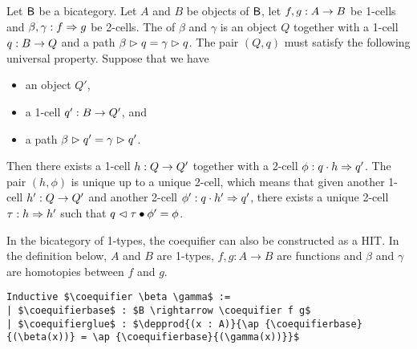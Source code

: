 \begin{definition}
Let $\mathsf{B}$ be a bicategory. Let $A$ and $B$ be objects of $\mathsf{B}$, let $f,
g : A \rightarrow B$ be 1-cells and $\beta,\gamma : f \Rightarrow
g$ be 2-cells. The  of $\beta$ and $\gamma$ is an object $Q$
together with a 1-cell $q : B \rightarrow Q$ and a path
$\beta \vartriangleright q = \gamma \vartriangleright q$.
The pair $(Q,q)$ must satisfy the following universal
property. Suppose that we have
\begin{itemize}
\item an object $Q'$,
\item a 1-cell $q' : B \rightarrow Q'$, and
\item a path $\beta \vartriangleright q' = \gamma \vartriangleright q'$.
\end{itemize}
Then there exists a 1-cell $h : Q \rightarrow Q'$ together with a 2-cell
$\phi : q \cdot h \Rightarrow q'$. The pair $(h,\phi)$ is unique up to a unique 2-cell, which means that
given another 1-cell $h' : Q \rightarrow Q'$ and another 2-cell $\phi' :
q \cdot h' \Rightarrow q'$, there exists a unique 2-cell $\tau : h
\Rightarrow h'$ such that $q \vartriangleleft \tau \bullet \phi' = \phi$.
\end{definition}

In the bicategory of 1-types, the coequifier can also be constructed as a HIT. In
the definition below, $A$ and $B$ are 1-types, $f , g: A \to B$ are
functions and $\beta$ and $\gamma$ are homotopies between $f$ and $g$.
\begin{lstlisting}[mathescape=true]
Inductive $\coequifier \beta \gamma$ :=
| $\coequifierbase$ : $B \rightarrow \coequifier f g$
| $\coequifierglue$ : $\depprod{(x : A)}{\ap {\coequifierbase}{(\beta(x))} = \ap {\coequifierbase}{(\gamma(x))}}$
\end{lstlisting}

